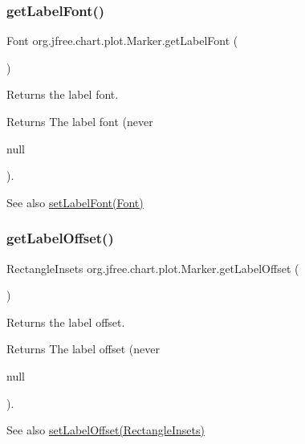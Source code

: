 \subsubsection{\texorpdfstring{get\+Label\+Font()}{getLabelFont()}}
{\footnotesize\ttfamily Font org.\+jfree.\+chart.\+plot.\+Marker.\+get\+Label\+Font (\begin{DoxyParamCaption}{ }\end{DoxyParamCaption})}

Returns the label font.

\begin{DoxyReturn}{Returns}
The label font (never
\begin{DoxyCode}
null 
\end{DoxyCode}
 ).
\end{DoxyReturn}
\begin{DoxySeeAlso}{See also}
\mbox{\hyperlink{classorg_1_1jfree_1_1chart_1_1plot_1_1_marker_af5f77944a9b858bd7dc2da90287df3c6}{set\+Label\+Font(\+Font)}} 
\end{DoxySeeAlso}
\mbox{\label{classorg_1_1jfree_1_1chart_1_1plot_1_1_marker_afeb7667415110c87d2ab08965dc56bc9}} 
\subsubsection{\texorpdfstring{get\+Label\+Offset()}{getLabelOffset()}}
{\footnotesize\ttfamily Rectangle\+Insets org.\+jfree.\+chart.\+plot.\+Marker.\+get\+Label\+Offset (\begin{DoxyParamCaption}{ }\end{DoxyParamCaption})}

Returns the label offset.

\begin{DoxyReturn}{Returns}
The label offset (never
\begin{DoxyCode}
null 
\end{DoxyCode}
 ).
\end{DoxyReturn}
\begin{DoxySeeAlso}{See also}
\mbox{\hyperlink{classorg_1_1jfree_1_1chart_1_1plot_1_1_marker_a38b7f54bed2200e77aac141fa1fd3980}{set\+Label\+Offset(\+Rectangle\+Insets)}} 
\end{DoxySeeAlso}
\mbox{\label{classorg_1_1jfree_1_1chart_1_1plot_1_1_marker_aac843d9d59a3fb72e8043bd82eacf86c}} 
